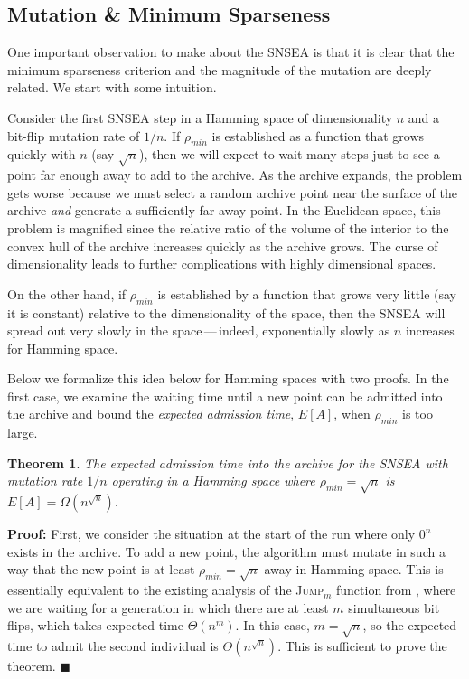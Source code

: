 \documentclass[twoside]{article}
\newtheorem{theorem}{Theorem}
\begin{document}
\subsection{Mutation \& Minimum Sparseness}
\label{subsec:mutation}
One important observation to make about the SNSEA is that it is clear that the minimum sparseness criterion and the magnitude of the mutation are deeply related.  We start with some intuition.

Consider the first SNSEA step in a Hamming space of dimensionality $n$ and a bit-flip mutation rate of $1/n$.  If $\rho_{min}$ is established as a function that grows quickly with $n$ (say $\sqrt{n}$), then we will expect to wait many steps just to see a point far enough away to add to the archive.  As the archive expands, the problem gets worse because we must select a random archive point near the surface of the archive \emph{and} generate a sufficiently far away point.  In the Euclidean space, this problem is magnified since the relative ratio of the volume of the interior to the convex hull of the archive increases quickly as the archive grows.  The curse of dimensionality leads to further complications with highly dimensional spaces.

On the other hand, if $\rho_{min}$ is established by a function that grows very little (say it is constant) relative to the dimensionality of the space, then the SNSEA will spread out very slowly in the space\,---\,indeed, exponentially slowly as $n$ increases for Hamming space.  

Below we formalize this idea below for Hamming spaces with two proofs.  In the first case, we examine the waiting time until a new point can be admitted into the archive and bound the \emph{expected admission time}, $E[A]$, when $\rho_{min}$ is too large.  

\begin{theorem}
The expected admission time into the archive for the SNSEA with mutation rate $1/n$ operating in a Hamming space where $\rho_{min} = \sqrt{n}$ is $E[A] = \Omega(n^{\sqrt{n}})$.
\end{theorem}
\textbf{Proof:} First, we consider the situation at the start of the run where only $0^n$ exists in the archive.  To add a new point, the algorithm must mutate in such a way that the new point is at least $\rho_{min} = \sqrt{n}$ away in Hamming space.  This is essentially equivalent to the existing analysis of the \textsc{Jump}$_m$ function from \citep{Droste2003}, where we are waiting for a generation in which there are at least $m$ simultaneous bit flips, which takes expected time $\Theta(n^m)$.  In this case, $m = \sqrt{n}$, so the expected time to admit the second individual is $\Theta(n^{\sqrt{n}})$.  This is sufficient to prove the theorem. $\blacksquare$
\end{document}
